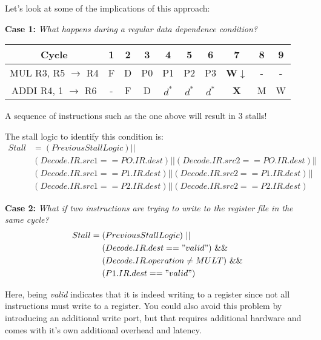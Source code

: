 \documentclass[12pt]{article}
\newenvironment{QandA}{\begin{enumerate}[label=\bfseries\arabic*.]\bfseries}
                      {\end{enumerate}}
\newenvironment{answered}{\par\quad\normalfont}{}
\begin{document}
\begin{QandA}
\begin{answered}
    Let's look at some of the implications of this approach:
    
    \textbf{Case 1:} \textit{What happens during a regular data dependence condition?}
    
    \begin{center}
    \begin{tabular}{ |c|c|c|c|c|c|c|c|c|c| } 
     \hline
     Cycle & 1 & 2 & 3 & 4 & 5 & 6 & 7 & 8 & 9\\ 
     \hline
     MUL R3, R5 $\rightarrow$ R4 & F & D & P0 & P1 & P2 & P3 & \textbf{W}$\downarrow$ & - & -\\ 
     ADDI R4, 1 $\rightarrow$ R6 & - & F & D & $d^{*}$ & $d^{*}$ & $d^{*}$ & \textbf{X } & M & W \\ 
     \hline
    \end{tabular}
    \end{center} 
    
    A sequence of instructions such as the one above will result in 3 stalls!
    
    The stall logic to identify this condition is:
    \begin{equation*}
    \begin{split}
    Stall & = (PreviousStallLogic)|| \\ & (Decode.IR.src1 == PO.IR.dest)||  (Decode.IR.src2 == PO.IR.dest)|| \\ & (Decode.IR.src1 == P1.IR.dest)|| 
    (Decode.IR.src2 == P1.IR.dest)|| \\ & (Decode.IR.src1 == P2.IR.dest)|| 
    (Decode.IR.src2 == P2.IR.dest)
    \end{split}
    \end{equation*}    
    
    \textbf{Case 2:} \textit{What if two instructions are trying to write to the register file in the same cycle?}
    \begin{equation*}
    \begin{split}
    Stall & = (PreviousStallLogic)\ || \\ &\ \ \ \ (Decode.IR.dest == "valid")\ \&\& \\  &\ \ \ \ (Decode.IR.operation \neq MULT)\ \&\& \\ &\ \ \ \  (P1.IR.dest == "valid")
    \end{split}
    \end{equation*}  
    
    Here, being \textit{valid} indicates that it is indeed writing to a register since not all instructions must write to a register. You could also avoid this problem by introducing an additional write port, but that requires additional hardware and comes with it's own additional overhead and latency.
    

\end{answered}
\end{QandA}
\end{document}

